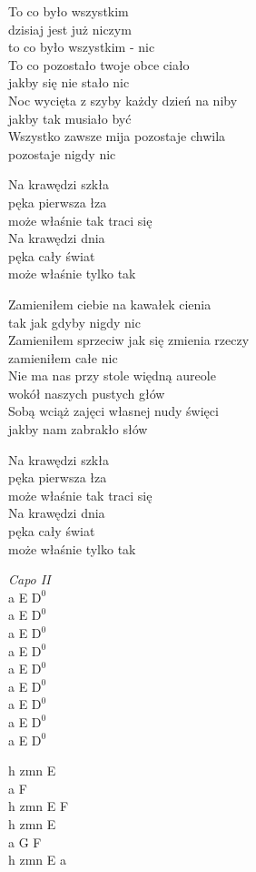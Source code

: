 \begin{text}
    \hfill\break
    To co było wszystkim\\
    dzisiaj jest już niczym\\
    to co było wszystkim - nic\\
    To co pozostało twoje obce ciało\\
    jakby się nie stało nic\\
    Noc wycięta z szyby każdy dzień na niby\\
    jakby tak musiało być\\
    Wszystko zawsze mija pozostaje chwila\\
    pozostaje nigdy nic

    Na krawędzi szkła\\
    pęka pierwsza łza\\
    może właśnie tak traci się\\
    Na krawędzi dnia\\
    pęka cały świat\\
    może właśnie tylko tak

    Zamieniłem ciebie na kawałek cienia\\
    tak jak gdyby nigdy nic\\
    Zamieniłem sprzeciw jak się zmienia rzeczy\\
    zamieniłem całe nic\\
    Nie ma nas przy stole więdną aureole\\
    wokół naszych pustych głów\\
    Sobą wciąż zajęci własnej nudy święci\\
    jakby nam zabrakło słów

    Na krawędzi szkła\\
    pęka pierwsza łza\\
    może właśnie tak traci się\\
    Na krawędzi dnia\\
    pęka cały świat\\
    może właśnie tylko tak
\end{text}
\begin{chord}
    \textit{Capo II}\\
    a E $\mathrm{D^0}$\\
    a E $\mathrm{D^0}$\\
    a E $\mathrm{D^0}$\\
    a E $\mathrm{D^0}$\\
    a E $\mathrm{D^0}$\\
    a E $\mathrm{D^0}$\\
    a E $\mathrm{D^0}$\\
    a E $\mathrm{D^0}$\\
    a E $\mathrm{D^0}$

    h zmn E\\
    a F\\
    h zmn E F\\
    h zmn E\\
    a G F\\
    h zmn E a

\end{chord}
